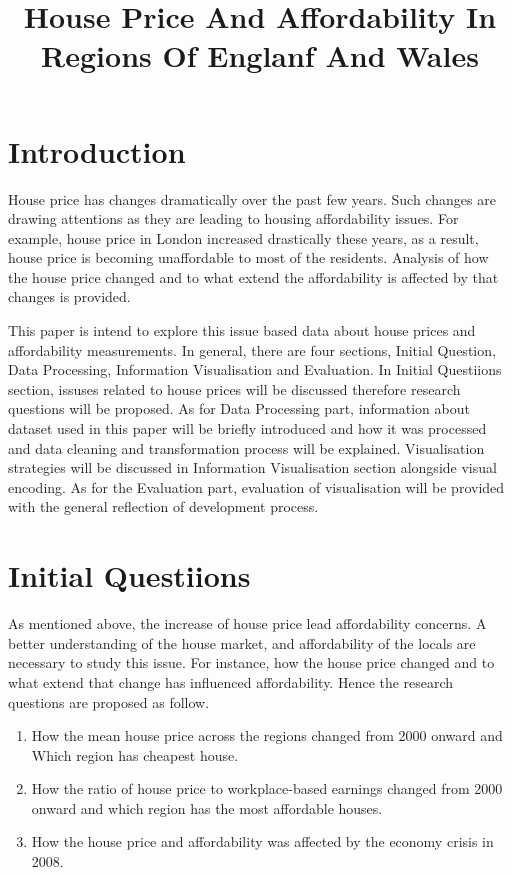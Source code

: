 \documentclass{article}
\title{House Price And Affordability In Regions Of Englanf And Wales}
\begin{document}
%
\maketitle
%

\section{Introduction}
House price has changes dramatically over the past few years. Such changes are drawing 
attentions as they are leading to housing affordability issues. For example, house price 
in London increased drastically these years, as a result, house price is becoming unaffordable
to most of the residents. Analysis of how the house price changed and 
to what extend the affordability is affected by that changes is provided.

This paper is intend to explore this issue based data about house prices and affordability measurements. 
In general, there are four sections, Initial Question, Data Processing, Information Visualisation and Evaluation.
In Initial Questiions section, issuses related to house prices will be discussed therefore research questions 
will be proposed. As for Data Processing part, information about dataset used in this paper will be briefly 
introduced and how it was processed and data cleaning and transformation process will be explained. 
Visualisation strategies will be discussed in Information Visualisation section alongside visual encoding. 
As for the Evaluation part, evaluation of visualisation will be provided with the general reflection of development process.

\section{Initial Questiions}
As mentioned above, the increase of house price lead affordability concerns. A better understanding of 
the house market, and affordability of the locals are necessary to study this issue. For instance, 
how the house price changed and to what extend that change has influenced affordability. Hence 
the research questions are proposed as follow.

\begin{enumerate}
  \item How the mean house price across the regions changed 
  from 2000 onward and Which region has cheapest house.
  \item How the ratio of house price to workplace-based earnings
  changed from 2000 onward and which region has the most affordable
  houses.
  \item How the house price and affordability was affected by the economy crisis in 2008.
\end{enumerate}
\end{document}
